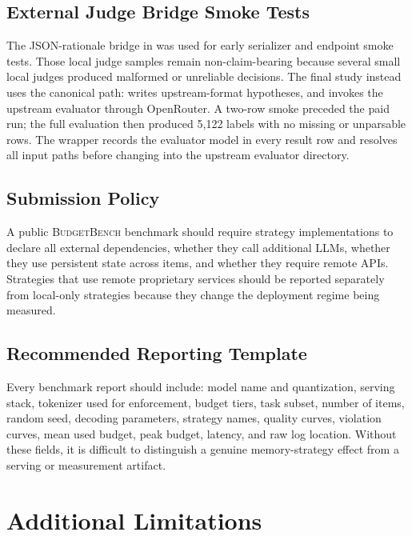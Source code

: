 \documentclass[11pt]{article}
\newcommand{\BudgetBench}{\textsc{BudgetBench}}
\begin{document}
\subsection{External Judge Bridge Smoke Tests}
\label{app:judge_bridge}

The JSON-rationale bridge in  was
used for early serializer and endpoint smoke tests.  Those local judge samples
remain non-claim-bearing because several small local judges produced malformed
or unreliable decisions.  The final study instead uses the canonical path:
 writes upstream-format
hypotheses, and  invokes the
upstream evaluator through OpenRouter.  A two-row smoke preceded the paid run;
the full evaluation then produced 5,122 labels with no missing or unparsable
rows.  The wrapper records the evaluator model in every result row and resolves
all input paths before changing into the upstream evaluator directory.

\subsection{Submission Policy}

A public \BudgetBench{} benchmark should require strategy implementations to
declare all external dependencies, whether they call additional LLMs, whether
they use persistent state across items, and whether they require remote APIs.
Strategies that use remote proprietary services should be reported separately
from local-only strategies because they change the deployment regime being
measured.

\subsection{Recommended Reporting Template}

Every benchmark report should include: model name and quantization, serving
stack, tokenizer used for enforcement, budget tiers, task subset, number of
items, random seed, decoding parameters, strategy names, quality curves,
violation curves, mean used budget, peak budget, latency, and raw log location.
Without these fields, it is difficult to distinguish a genuine memory-strategy
effect from a serving or measurement artifact.

\section{Additional Limitations}
\end{document}
